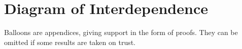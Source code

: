 
\chapter{Diagram of Interdependence}

\begin{center}
\end{center}

\vspace*{3ex}
\noindent
Balloons are appendices, giving support in the form of proofs.  They can be
omitted if some results are taken on trust.


